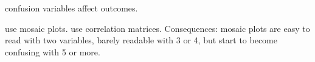 
\Problem

confusion variables affect outcomes.

\Context

\Solution

use mosaic plots. use correlation matrices.
Consequences: mosaic plots are easy to read with two variables, barely readable with 3 or 4, but start to become confusing with 5 or more.